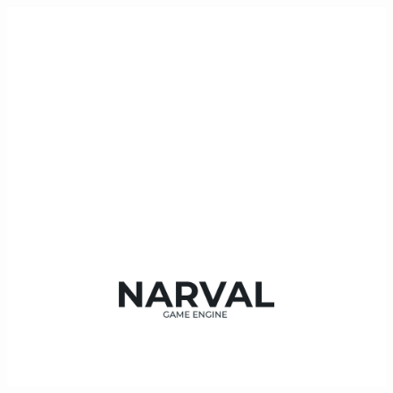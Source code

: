 \documentclass[12pt, 
openright, 
oneside, 
a4paper,    
brazil]{facom-ufu-abntex2}
\begin{document}
\begin{figure}[H]
	\centering
	\includegraphics[width=\textwidth]{imagens/logoText.png}
\end{figure}
\clearpage

\end{document}
